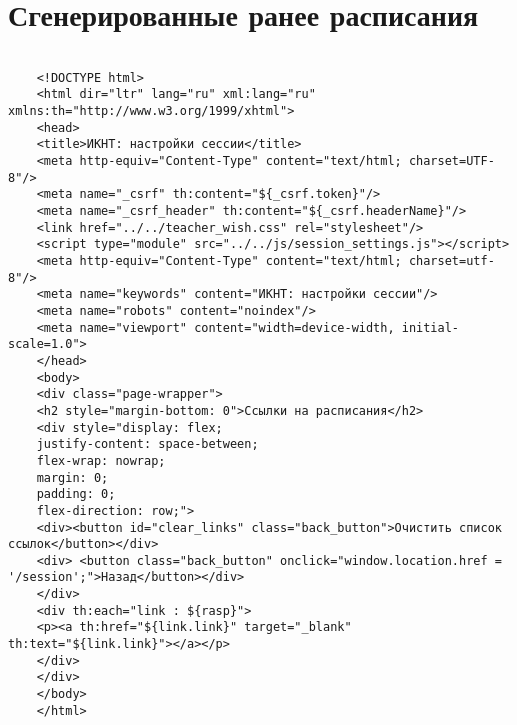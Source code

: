 \chapter{Сгенерированные ранее расписания}\label{appendix-link}	

\begin{lstlisting}
	
	<!DOCTYPE html>
	<html dir="ltr" lang="ru" xml:lang="ru" xmlns:th="http://www.w3.org/1999/xhtml">
	<head>
	<title>ИКНТ: настройки сессии</title>
	<meta http-equiv="Content-Type" content="text/html; charset=UTF-8"/>
	<meta name="_csrf" th:content="${_csrf.token}"/>
	<meta name="_csrf_header" th:content="${_csrf.headerName}"/>
	<link href="../../teacher_wish.css" rel="stylesheet"/>
	<script type="module" src="../../js/session_settings.js"></script>
	<meta http-equiv="Content-Type" content="text/html; charset=utf-8"/>
	<meta name="keywords" content="ИКНТ: настройки сессии"/>
	<meta name="robots" content="noindex"/>
	<meta name="viewport" content="width=device-width, initial-scale=1.0">
	</head>
	<body>
	<div class="page-wrapper">
	<h2 style="margin-bottom: 0">Ссылки на расписания</h2>
	<div style="display: flex;
	justify-content: space-between;
	flex-wrap: nowrap;
	margin: 0;
	padding: 0;
	flex-direction: row;">
	<div><button id="clear_links" class="back_button">Очистить список ссылок</button></div>
	<div> <button class="back_button" onclick="window.location.href = '/session';">Назад</button></div>
	</div>
	<div th:each="link : ${rasp}">
	<p><a th:href="${link.link}" target="_blank" th:text="${link.link}"></a></p>
	</div>
	</div>
	</body>
	</html>
	
\end{lstlisting}